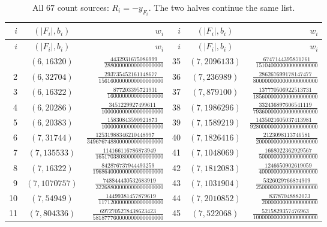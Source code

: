 \documentclass[11pt]{article}
\theoremstyle{remark}
\numberwithin{equation}{section}
\begin{document}
\clearpage
\begingroup
\footnotesize
\setlength{\tabcolsep}{3pt}
\renewcommand{\arraystretch}{1.35}
\begin{longtable}{rcr@{\qquad}rcr}
\caption{All $67$ count sources: $R_i=-y_{F_i}$. The two halves continue the same list.}\label{tab:405-countdata}\\
\toprule
$i$&$(|F_i|,b_i)$&$w_i$&$i$&$(|F_i|,b_i)$&$w_i$\\\midrule
\endfirsthead
\toprule
$i$&$(|F_i|,b_i)$&$w_i$&$i$&$(|F_i|,b_i)$&$w_i$\\\midrule
\endhead
\bottomrule\endfoot
1 & $(6,16320)$ & $\frac{4432931675086999}{28800000000000000000}$ & 35 & $(7,2096133)$ & $\frac{6747144395871761}{151040000000000000000}$\\[2pt]
2 & $(6,32704)$ & $\frac{293735452161148677}{1561600000000000000000}$ & 36 & $(7,236989)$ & $\frac{286267699178147477}{8000000000000000000000}$\\[2pt]
3 & $(6,16322)$ & $\frac{877203395721931}{1600000000000000000}$ & 37 & $(7,879100)$ & $\frac{137770506922513731}{1856000000000000000000}$\\[2pt]
4 & $(6,20286)$ & $\frac{3451229927499611}{100000000000000000000}$ & 38 & $(7,1986296)$ & $\frac{332436897606541119}{7936000000000000000000}$\\[2pt]
5 & $(6,20383)$ & $\frac{15830843590921873}{100000000000000000000}$ & 39 & $(7,1589219)$ & $\frac{1435021605037413981}{92800000000000000000000}$\\[2pt]
6 & $(7,31744)$ & $\frac{12531988346210448997}{34967674880000000000000000}$ & 40 & $(7,1826416)$ & $\frac{2123098113746581}{200000000000000000000}$\\[2pt]
7 & $(7,135533)$ & $\frac{114166116786873949}{16517038080000000000000}$ & 41 & $(7,1048069)$ & $\frac{1668022362929567}{50000000000000000000}$\\[2pt]
8 & $(7,16322)$ & $\frac{842876737944493259}{196864000000000000000000}$ & 42 & $(7,1812083)$ & $\frac{1246650902619059}{40000000000000000000}$\\[2pt]
9 & $(7,1070757)$ & $\frac{748844430532683919}{32268800000000000000000}$ & 43 & $(7,1031904)$ & $\frac{5326029766874909}{250000000000000000000}$\\[2pt]
10 & $(7,54949)$ & $\frac{14499381457879619}{1171200000000000000000}$ & 44 & $(7,2010852)$ & $\frac{83787048882073}{2000000000000000000}$\\[2pt]
11 & $(7,804336)$ & $\frac{6972705278438623423}{581877760000000000000000}$ & 45 & $(7,522068)$ & $\frac{5215829357476963}{1000000000000000000000}$\\[2pt]

\end{longtable}
\end{document}
